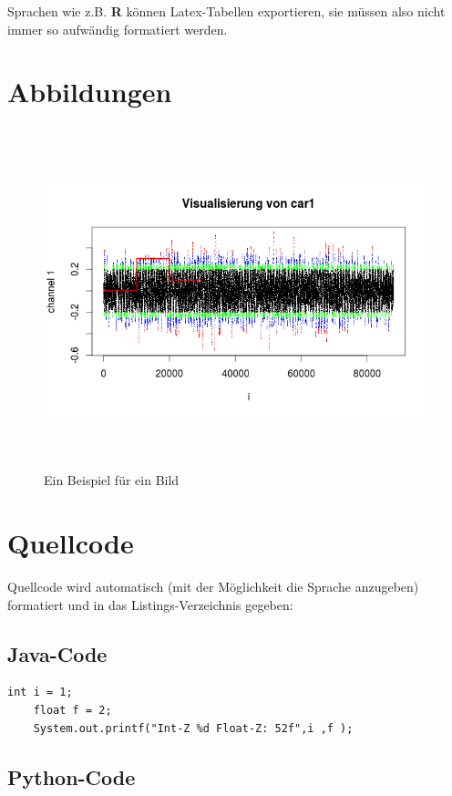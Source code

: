 Sprachen wie z.B. \textbf{R} können Latex-Tabellen exportieren, sie müssen also nicht immer so aufwändig formatiert werden.			


\section{Abbildungen}

\begin{figure}[H]
	\hspace*{-1.5cm}
	\includegraphics[width=512pt,height=280pt]{figures/bsp.png}
	\caption{Ein Beispiel für ein Bild}
	\label{bild:beispiel}
\end{figure}


\section{Quellcode}

Quellcode wird automatisch (mit der Möglichkeit die Sprache anzugeben) formatiert und in das Listings-Verzeichnis gegeben:

\subsection{Java-Code}

\begin{lstlisting}[style=Java, caption={Java-Beispiel}, captionpos=b]
	int i = 1;
	float f = 2;
	System.out.printf("Int-Z %d Float-Z: 52f",i ,f );
\end{lstlisting} 


\subsection{Python-Code}


